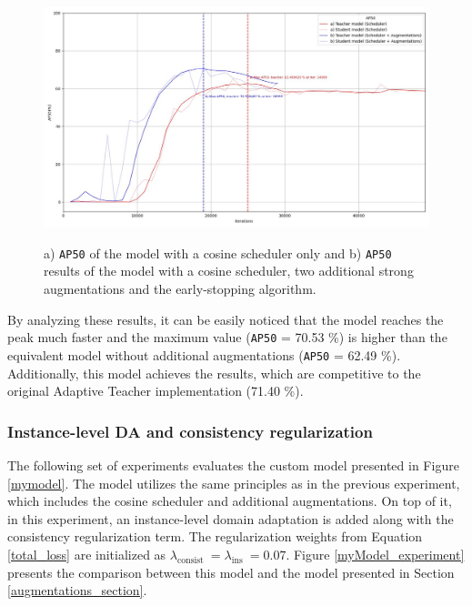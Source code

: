 \begin{figure}[htb]
	\begin{center}
		\includegraphics[width=14cm]{./AP50_augmentation.jpg}
	\end{center}
	\caption{a) \texttt{AP50} of the model with a cosine scheduler only and b) \texttt{AP50} results of the model with a cosine scheduler, two additional strong augmentations and the early-stopping algorithm.}
	\begin{center}
		\label{augmentation_experiment}
	\end{center}
\end{figure}

By analyzing these results, it can be easily noticed that the model reaches the peak much faster and the maximum value (\texttt{AP50} = 70.53 \%) is higher than the equivalent model without additional augmentations (\texttt{AP50} = 62.49 \%). Additionally, this model achieves the results, which are competitive to the original Adaptive Teacher implementation (71.40 \%).

\FloatBarrier  

\subsubsection{Instance-level DA and consistency regularization}
The following set of experiments evaluates the custom model presented in Figure \ref{mymodel}. The model utilizes the same principles as in the previous experiment, which includes the cosine scheduler and additional augmentations. On top of it, in this experiment, an instance-level domain adaptation is added along with the consistency regularization term. The regularization weights from Equation \ref{total_loss} are initialized as $\lambda_{\text {consist }} = \lambda_{\text {ins }} = 0.07$. Figure \ref{myModel_experiment} presents the comparison between this model and the model presented in Section \ref{augmentations_section}.

